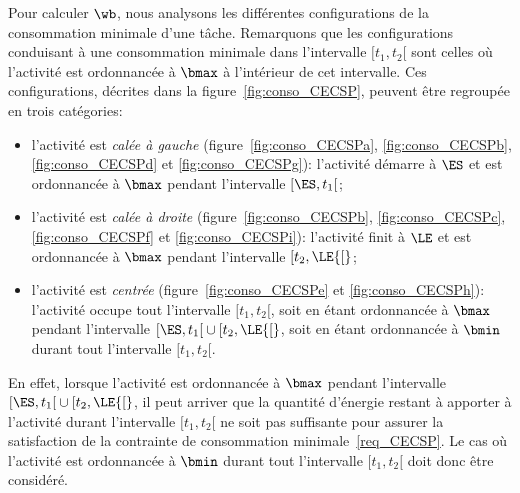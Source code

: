 Pour calculer $\wb$, nous analysons les différentes configurations de
la consommation minimale d'une tâche. Remarquons que les
configurations conduisant à une consommation minimale dans
l'intervalle $[t_1,t_2{[}$ sont celles où l'activité est ordonnancée à
$\bmax$ à l'intérieur de cet intervalle. Ces configurations, décrites
dans la figure~\ref{fig:conso_CECSP}, peuvent être regroupée en trois
catégories:
\begin{itemize}
\item l'activité est {\it calée à
gauche} (figure~\ref{fig:conso_CECSPa}, \ref{fig:conso_CECSPb},
\ref{fig:conso_CECSPd} et \ref{fig:conso_CECSPg}): l'activité démarre
à $\ES$ et est ordonnancée à $\bmax$ pendant l'intervalle
$[\ES,t_1{[}$;
\item l'activité est {\it calée à
droite} (figure~\ref{fig:conso_CECSPb}, \ref{fig:conso_CECSPc},
\ref{fig:conso_CECSPf} et \ref{fig:conso_CECSPi}): l'activité finit à
$\LE$ et est ordonnancée à $\bmax$ pendant l'intervalle $[t_2,\LE{[}$;
\item l'activité est {\it centrée} (figure~\ref{fig:conso_CECSPe} et
\ref{fig:conso_CECSPh}): l'activité occupe tout l'intervalle
$[t_1,t_2[$, soit en étant ordonnancée à $\bmax$ pendant l'intervalle
$[\ES,t_1{[} \cup [t_2,\LE{[}$, soit en étant ordonnancée à $\bmin$
durant tout l'intervalle $[t_1,t_2{[}$.
\end{itemize}
En effet, lorsque l'activité est ordonnancée à $\bmax$ pendant
l'intervalle $[\ES,t_1{[} \cup [t_2,\LE{[}$, il peut arriver que la
quantité d'énergie restant à apporter à l'activité durant l'intervalle
$[t_1,t_2[$ ne soit pas suffisante pour assurer la satisfaction de la
contrainte de consommation minimale~\eqref{req_CECSP}. Le cas où
l'activité est ordonnancée à $\bmin$ durant tout l'intervalle
$[t_1,t_2{[}$ doit donc être considéré.

